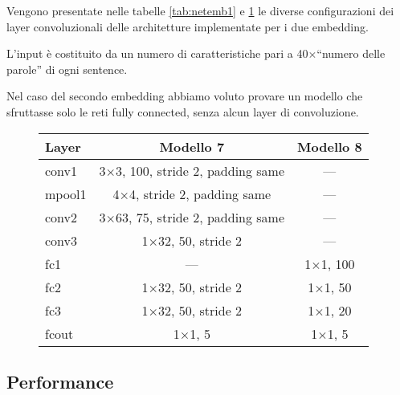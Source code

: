 Vengono presentate nelle tabelle \ref{tab:netemb1} e \ref{tab:netemb2} le diverse configurazioni dei layer convoluzionali delle architetture implementate per i due embedding.

{\color{red}L'input è costituito da un numero di caratteristiche pari a \num{40}$\times$``numero delle parole'' di ogni sentence.}

Nel caso del secondo embedding abbiamo voluto provare un modello che sfruttasse solo le reti fully connected, senza alcun layer di convoluzione. 

\begin{figure}[H]
	\centering
	\begin{tabular}{lcc}
		\toprule
		\textbf{Layer}& \textbf{Modello 7} 								  & \textbf{Modello 8} 			   \\ 
		\midrule
		conv1 	& \num{3}$\times$\num{3}, 100, stride 2, padding same     & ---	   \\
		mpool1 	& \num{4}$\times$\num{4}, stride 2, padding same		  & ---	   \\
		conv2  	& \num{3}$\times$\num{63}, 75, stride 2, padding same	  & ---    \\
		conv3  	& \num{1}$\times$\num{32}, 50, stride 2	  				  & ---	   \\
		fc1  	& ---													  & \num{1}$\times$\num{1}, 100	   \\
		fc2  	& \num{1}$\times$\num{32}, 50, stride 2	  				  & \num{1}$\times$\num{1},  50    \\
		fc3  	& \num{1}$\times$\num{32}, 50, stride 2	  				  & \num{1}$\times$\num{1},  20	   \\
		fcout	& \num{1}$\times$\num{1}, 5   			  				  & \num{1}$\times$\num{1},   5	   \\
		\bottomrule	
	\end{tabular}
	\label{tab:netemb2}
\end{figure}

\subsection{Performance}
\label{subsec:performance2}

